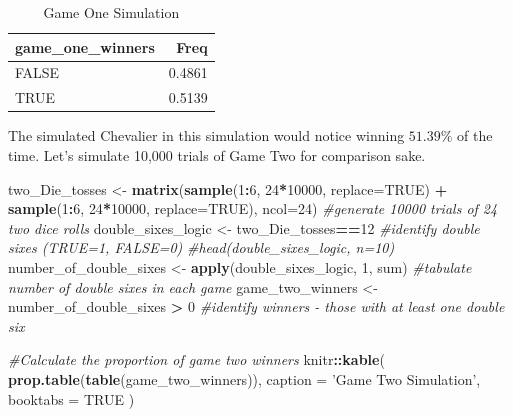 \documentclass[]{book}
\newenvironment{Shaded}{\begin{snugshade}}{\end{snugshade}}
\newcommand{\KeywordTok}[1]{\textcolor[rgb]{0.13,0.29,0.53}{\textbf{#1}}}
\newcommand{\DataTypeTok}[1]{\textcolor[rgb]{0.13,0.29,0.53}{#1}}
\newcommand{\DecValTok}[1]{\textcolor[rgb]{0.00,0.00,0.81}{#1}}
\newcommand{\StringTok}[1]{\textcolor[rgb]{0.31,0.60,0.02}{#1}}
\newcommand{\CommentTok}[1]{\textcolor[rgb]{0.56,0.35,0.01}{\textit{#1}}}
\newcommand{\OtherTok}[1]{\textcolor[rgb]{0.56,0.35,0.01}{#1}}
\newcommand{\OperatorTok}[1]{\textcolor[rgb]{0.81,0.36,0.00}{\textbf{#1}}}
\newcommand{\NormalTok}[1]{#1}
\theoremstyle{definition}
\theoremstyle{definition}
\theoremstyle{definition}
\theoremstyle{remark}
\begin{document}
\begin{table}

\caption{\label{tab:nice-tab-61}Game One Simulation}
\centering
\begin{tabular}[t]{lr}
\toprule
game\_one\_winners & Freq\\
\midrule
FALSE & 0.4861\\
TRUE & 0.5139\\
\bottomrule
\end{tabular}
\end{table}

The simulated Chevalier in this simulation would notice winning
\(51.39\%\) of the time. Let's simulate 10,000 trials of Game Two for
comparison sake.

\begin{Shaded}
\begin{Highlighting}[]
\NormalTok{two_Die_tosses <-}\StringTok{ }\KeywordTok{matrix}\NormalTok{(}\KeywordTok{sample}\NormalTok{(}\DecValTok{1}\OperatorTok{:}\DecValTok{6}\NormalTok{, }\DecValTok{24}\OperatorTok{*}\DecValTok{10000}\NormalTok{, }\DataTypeTok{replace=}\OtherTok{TRUE}\NormalTok{) }\OperatorTok{+}\StringTok{ }
\StringTok{    }\KeywordTok{sample}\NormalTok{(}\DecValTok{1}\OperatorTok{:}\DecValTok{6}\NormalTok{, }\DecValTok{24}\OperatorTok{*}\DecValTok{10000}\NormalTok{, }\DataTypeTok{replace=}\OtherTok{TRUE}\NormalTok{), }\DataTypeTok{ncol=}\DecValTok{24}\NormalTok{) }\CommentTok{#generate 10000 trials of 24 two dice rolls}
\NormalTok{double_sixes_logic <-}\StringTok{ }\NormalTok{two_Die_tosses}\OperatorTok{==}\DecValTok{12} \CommentTok{#identify double sixes (TRUE=1, FALSE=0)}
\CommentTok{#head(double_sixes_logic, n=10) }
\NormalTok{number_of_double_sixes <-}\StringTok{ }\KeywordTok{apply}\NormalTok{(double_sixes_logic, }\DecValTok{1}\NormalTok{, sum) }\CommentTok{#tabulate number of double sixes in each game}
\NormalTok{game_two_winners <-}\StringTok{ }\NormalTok{number_of_double_sixes }\OperatorTok{>}\StringTok{ }\DecValTok{0} \CommentTok{#identify winners - those with at least one double six}

\CommentTok{#Calculate the proportion of game two winners}
\NormalTok{knitr}\OperatorTok{::}\KeywordTok{kable}\NormalTok{(}
  \KeywordTok{prop.table}\NormalTok{(}\KeywordTok{table}\NormalTok{(game_two_winners)), }\DataTypeTok{caption =} \StringTok{'Game Two Simulation'}\NormalTok{,}
  \DataTypeTok{booktabs =} \OtherTok{TRUE}
\NormalTok{)}
\end{Highlighting}
\end{Shaded}
\end{document}
